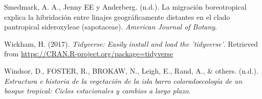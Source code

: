 \documentclass[11pt,]{article}
\begin{document}
\hypertarget{ref-smedmark2007boreotropical}{}
Smedmark, A. A., Jenny EE y Anderberg. (n.d.). La migración
boreotropical explica la hibridación entre linajes geográficamente
distantes en el clado pantropical sideroxyleae (sapotaceae).
\emph{American Journal of Botany}.

\hypertarget{ref-tidyverse}{}
Wickham, H. (2017). \emph{Tidyverse: Easily install and load the
'tidyverse'}. Retrieved from
\url{https://CRAN.R-project.org/package=tidyverse}

\hypertarget{ref-windsorestructura}{}
Windsor, D., FOSTER, R., BROKAW, N., Leigh, E., Rand, A., \& others.
(n.d.). \emph{Estructura e historia de la vegetación de la isla barro
coloradoecología de un bosque tropical: Ciclos estacionales y cambios a
largo plazo}.




\newpage
\singlespacing 
\end{document}
